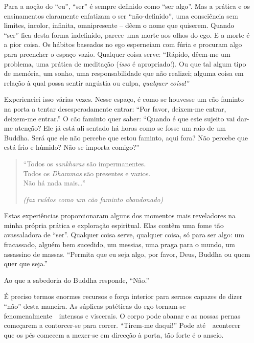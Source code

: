 Para a noção do ``eu'', ``ser'' é sempre definido como ``ser algo''. Mas
a prática e os ensinamentos claramente enfatizam o ser ``não-definido'',
uma consciência sem limites, incolor, infinita, omnipresente -- dêem o
nome que quiserem. Quando ``ser'' fica desta forma indefinido, parece
uma morte aos olhos do ego. E a morte é a pior coisa. Os hábitos
baseados no ego esperneiam com fúria e procuram algo para preencher o
espaço vazio. Qualquer coisa serve: ``Rápido, dêem-me um problema, uma
prática de meditação (\emph{isso} é apropriado!). Ou que tal algum tipo
de memória, um sonho, uma responsabilidade que não realizei; alguma
coisa em relação à qual possa sentir angústia ou culpa, \emph{qualquer
coisa}!''

Experienciei isso várias vezes. Nesse espaço, é como se houvesse um cão
faminto na porta a tentar desesperadamente entrar: ``Por favor,
deixem-me entrar, deixem-me entrar.'' O cão faminto quer saber: ``Quando
é que este sujeito vai dar-me atenção? Ele já está ali sentado há horas
como se fosse um raio de um Buddha. Será que ele não percebe que estou
faminto, aqui fora? Não percebe que está frio e húmido? Não se importa
comigo?''

\begin{quote}
  ``Todos os \emph{sankharas} são impermanentes.\\
  Todos os \emph{Dhammas} são presentes e vazios.\\
  Não há nada mais\ldots{}''

\emph{(faz ruídos como um cão faminto abandonado)}
\end{quote}

Estas experiências proporcionaram alguns dos momentos mais reveladores
na minha própria prática e exploração espiritual. Elas contêm uma fome
tão avassaladora de ``ser''. Qualquer coisa serve, qualquer coisa, só
para ser algo: um fracassado, alguém bem sucedido, um messias, uma praga
para o mundo, um assassino de massas. ``Permita que eu seja algo, por
favor, Deus, Buddha ou quem quer que seja.''

Ao que a sabedoria do Buddha responde, ``Não.''

É preciso termos enormes recursos e força interior para sermos capazes
de dizer ``não'' desta maneira. As súplicas patéticas do ego tornam-se
fenomenalmente~~intensas e viscerais. O corpo pode abanar e as nossas
pernas começarem a contorcer-se para correr. ``Tirem-me daqui!'' Pode
até~~acontecer que os pés comecem a mexer-se em direcção à porta, tão
forte é o anseio.

